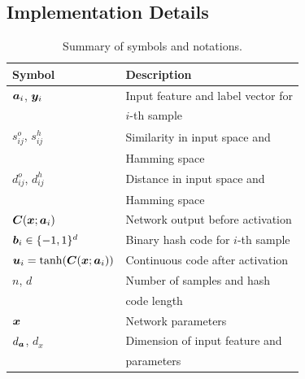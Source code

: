 \subsection{Implementation Details}
\label{Appendix: Details of experiment implementation}
\begin{table}[thbp]
    \centering
    \caption{Summary of symbols and notations.}
    \label{Table:notations_for_deep_hashing}
    \small
    \begin{tabular}{ll}
        \toprule 
        \textbf{Symbol} & \textbf{Description} \\
        \midrule 
        $\bm{a}_{i}$, $\bm{y}_{i}$ & Input feature and label vector for \\
                             & $i$-th sample \\
        $s_{ij}^{o}$, $s_{ij}^{h}$ & Similarity in input space and \\
                                   & Hamming space \\
        $d_{ij}^{o}$, $d_{ij}^{h}$ & Distance in input space and \\
                                   & Hamming space \\
        $\bm{C}(\bm{x}; \bm{a}_{i})$ & Network output before activation \\
        $\bm{b}_{i}\in \{-1, 1\}^{d}$ & Binary hash code for $i$-th sample \\
        $\bm{u}_{i}= \tanh(\bm{C}(\bm{x}; \bm{a}_{i}))$ & Continuous code after activation \\
        $n$, $d$ & Number of samples and hash \\
                 & code length \\
        $\bm{x}$ & Network parameters \\
        $d_{\bm{a}}$, $d_{x}$ & Dimension of input feature and \\
                           & parameters \\
        \bottomrule
    \end{tabular}
\end{table}
